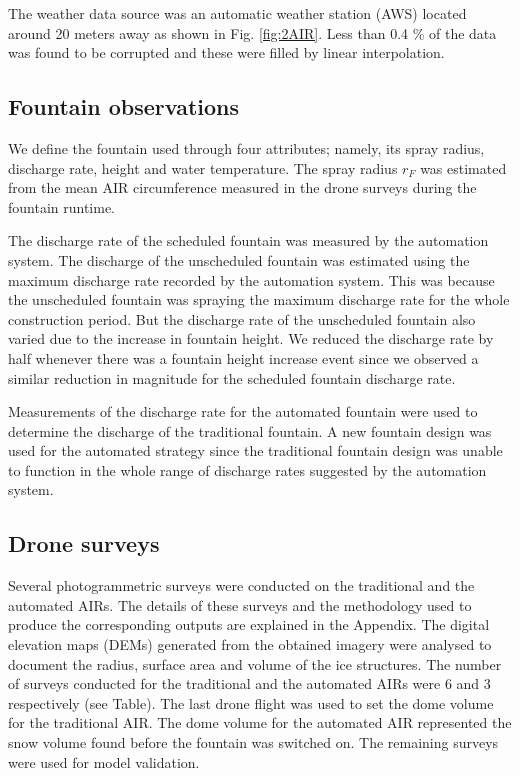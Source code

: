 \documentclass[tc, manuscript]{copernicus}
\begin{document}
The weather data source was an automatic weather station (AWS) located around 20 meters away as shown in Fig.
\ref{fig:2AIR}. Less than 0.4 \% of the data was found to be corrupted and these were filled by linear
interpolation. 

\subsection{Fountain observations}

We define the fountain used through four attributes; namely, its spray radius, discharge rate, height and water
temperature. The spray radius $r_F$ was estimated from the mean AIR circumference
measured in the drone surveys during the fountain runtime. 

The discharge rate of the scheduled fountain was measured by the automation system. The discharge of the
unscheduled fountain was estimated using the maximum discharge rate recorded by the automation system. This was
because the unscheduled fountain was spraying the maximum discharge rate for the whole construction period. But
the discharge rate of the unscheduled fountain also varied due to the increase in fountain height. We reduced
the discharge rate by half whenever there was a fountain height increase event since we observed a similar
reduction in magnitude for the scheduled fountain discharge rate.

Measurements of the discharge rate for the automated fountain were used to determine the discharge of the
traditional fountain. A new fountain design was used for the automated strategy since the traditional fountain
design was unable to function in the whole range of discharge rates suggested by the automation system.

\subsection{Drone surveys}

Several photogrammetric surveys were conducted on the traditional and the automated AIRs. The details of these
surveys and the methodology used to produce the corresponding outputs are explained in the Appendix. The digital
elevation maps (DEMs) generated from the obtained imagery were analysed to document the radius, surface area and
volume of the ice structures. The number of surveys conducted for the traditional and the automated AIRs were
6 and 3 respectively (see Table). The last drone flight was used to set the dome volume for the traditional AIR.
The dome volume for the automated AIR represented the snow volume found before the fountain was switched on. The
remaining surveys were used for model validation.
\end{document}
